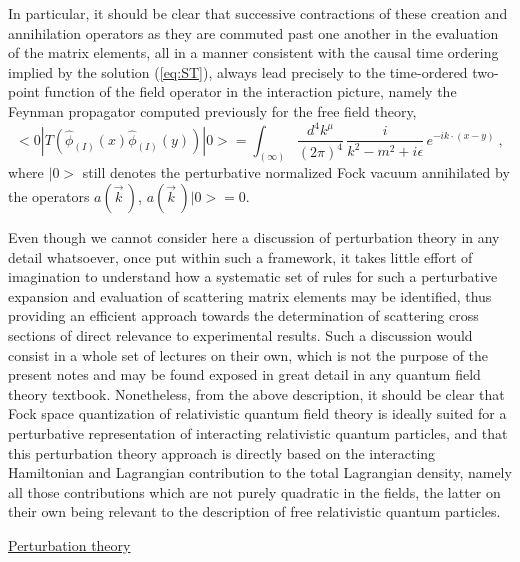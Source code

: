 \documentclass[a4paper,11pt]{article}
\begin{document}
In particular, it should be clear that successive contractions of these
creation and annihilation operators as they are commuted past one another
in the evaluation of the matrix elements, all in a manner consistent with 
the causal time ordering implied by the solution (\ref{eq:ST}), always lead 
precisely to the time-ordered two-point function of the field operator in the
interaction picture, namely the Feynman propagator computed previously
for the free field theory,
\begin{equation}
<0|T\left(\hat{\phi}_{(I)}(x)\hat{\phi}_{(I)}(y)\right)|0>=
\int_{(\infty)}\frac{d^4k^\mu}{(2\pi)^4}\,\frac{i}{k^2-m^2+i\epsilon}\,
e^{-ik\cdot(x-y)}\ ,
\end{equation}
where $|0>$ still denotes the perturbative normalized Fock vacuum annihilated 
by the operators $a(\vec{k}\,)$, $a(\vec{k}\,)|0>=0$.

Even though we cannot consider here a discussion of perturbation
theory in any detail whatsoever, once put within such a framework,
it takes little effort of imagination to understand how a systematic
set of rules for such a perturbative expansion and evaluation of
scattering matrix elements may be identified, thus providing an
efficient approach towards the determination
of scattering cross sections of direct relevance to experimental
results. Such a discussion would consist in a whole set of lectures
on their own, which is not the purpose of the present notes and may be found
exposed in great detail in any quantum field theory 
textbook.\cite{Wein2,PS,IZ,Ramond}
Nonetheless, from the above description, it should be clear that
Fock space quantization of relativistic quantum field theory is ideally
suited for a perturbative representation of interacting relativistic quantum
particles, and that this perturbation theory approach is directly based
on the interacting Hamiltonian and Lagrangian contribution to the total
Lagrangian density, namely all those contributions which are not
purely quadratic in the fields, the latter on their own being relevant to the
description of free relativistic quantum particles.

\vspace{10pt}

\noindent\underline{Perturbation theory}

\vspace{10pt}
\end{document}
